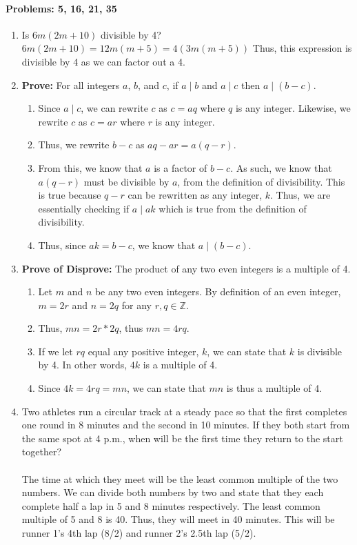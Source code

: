 \documentclass{article}
\makeatletter
\newcommand\setItemnumber[1]{\setcounter{enum\romannumeral\@enumdepth}{\numexpr#1-1\relax}}
\makeatother
\begin{document}
\paragraph{Problems: 5, 16, 21, 35}
\begin{enumerate}
    \setItemnumber{5}
    \item Is $6m(2m+10)$ divisible by 4? \\ $6m(2m+10) = 12m(m+5) = 4(3m(m+5))$ Thus, this expression is divisible by 4 as we can factor out a 4.
    \setItemnumber{16}
    \item \textbf{Prove: }For all integers $a$, $b$, and $c$, if $a\mid b$ and $a\mid c$ then $a \mid (b-c)$.\\
    \begin{enumerate}
        \item Since $a\mid c$, we can rewrite $c$ as $c = aq$ where $q$ is any integer. Likewise, we rewrite $c$ as $c=ar$ where $r$ is any integer.
        \item Thus, we rewrite  $b-c$ as $aq - ar = a(q-r)$.
        \item From this, we know that $a$ is a factor of $b-c$. As such, we know that $a(q-r)$ must be divisible by $a$, from the definition of divisibility. This is true because $q-r$ can be rewritten as any integer, $k$. Thus, we are essentially checking if $a \mid ak$ which is true from the definition of divisibility.
        \item Thus, since $ak = b-c$, we know that $a \mid (b-c)$.
    \end{enumerate}
    \setItemnumber{21}
    \item \textbf{Prove of Disprove: }The product of any two even integers is a multiple of 4.
    \begin{enumerate}
        \item Let $m$ and $n$ be any two even integers. By definition of an even integer, $m = 2r$ and $n = 2q$ for any $r, q \in\mathbb{Z}$.
        \item Thus, $mn = 2r*2q$, thus $mn = 4rq$.
        \item If we let $rq$ equal any positive integer, $k$, we can state that $k$ is divisible by 4. In other words, $4k$ is a multiple of 4.
        \item Since $4k = 4rq = mn$, we can state that $mn$ is thus a multiple of 4.
    \end{enumerate}
    \setItemnumber{35}
    \item Two athletes run a circular track at a steady pace so that the first completes one round in 8 minutes and the second in 10 minutes. If they both start from the same spot at 4 p.m., when will be the first time they return to the start together? \\ \\
    The time at which they meet will be the least common multiple of the two numbers. We can divide both numbers by two and state that they each complete half a lap in 5 and 8 minutes respectively. The least common multiple of 5 and 8 is 40. Thus, they will meet in 40 minutes. This will be runner 1's 4th lap (8/2) and runner 2's 2.5th lap (5/2). 
\end{enumerate}
\end{document}
